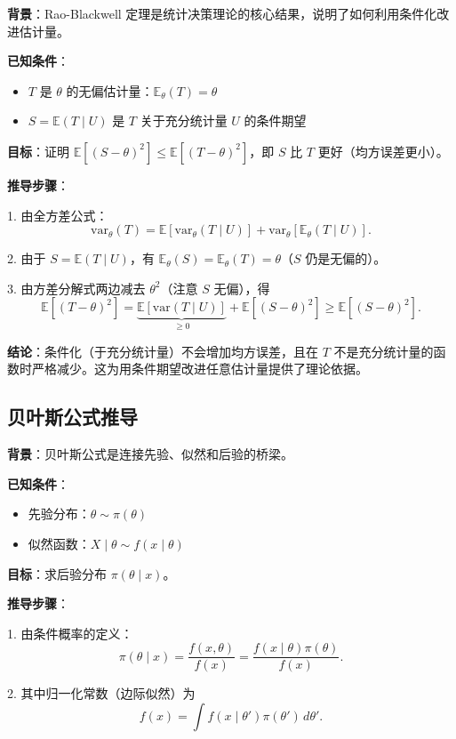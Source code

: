 \textbf{背景}：Rao-Blackwell 定理是统计决策理论的核心结果，说明了如何利用条件化改进估计量。

\textbf{已知条件}：
\begin{itemize}
\item $T$ 是 $\theta$ 的无偏估计量：$\mathbb{E}_\theta(T) = \theta$
\item $S = \mathbb{E}(T \mid U)$ 是 $T$ 关于充分统计量 $U$ 的条件期望
\end{itemize}

\textbf{目标}：证明 $\mathbb{E}[(S - \theta)^2] \leq \mathbb{E}[(T - \theta)^2]$，即 $S$ 比 $T$ 更好（均方误差更小）。

\textbf{推导步骤}：

1. 由全方差公式：
\[
\text{var}_\theta(T) = \mathbb{E}[\text{var}_\theta(T \mid U)] + \text{var}_\theta[\mathbb{E}_\theta(T \mid U)].
\]

2. 由于 $S = \mathbb{E}(T \mid U)$，有 $\mathbb{E}_\theta(S) = \mathbb{E}_\theta(T) = \theta$（$S$ 仍是无偏的）。

3. 由方差分解式两边减去 $\theta^2$（注意 $S$ 无偏），得
\[
\mathbb{E}[(T - \theta)^2] = \underbrace{\mathbb{E}[\text{var}(T \mid U)]}_{\geq 0} + \mathbb{E}[(S - \theta)^2] \geq \mathbb{E}[(S - \theta)^2].
\]

\textbf{结论}：条件化（于充分统计量）不会增加均方误差，且在 $T$ 不是充分统计量的函数时严格减少。这为用条件期望改进任意估计量提供了理论依据。

\subsection{贝叶斯公式推导}\label{sec:derivation-ch2-bayes-theorem}

\textbf{背景}：贝叶斯公式是连接先验、似然和后验的桥梁。

\textbf{已知条件}：
\begin{itemize}
\item 先验分布：$\theta \sim \pi(\theta)$
\item 似然函数：$X \mid \theta \sim f(x \mid \theta)$
\end{itemize}

\textbf{目标}：求后验分布 $\pi(\theta \mid x)$。

\textbf{推导步骤}：

1. 由条件概率的定义：
\[
\pi(\theta \mid x) = \frac{f(x, \theta)}{f(x)} = \frac{f(x \mid \theta) \pi(\theta)}{f(x)}.
\]

2. 其中归一化常数（边际似然）为
\[
f(x) = \int f(x \mid \theta') \pi(\theta') \, d\theta'.
\]

